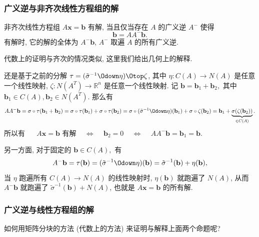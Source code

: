 \begin{frame}
\frametitle{广义逆与非齐次线性方程组的解}

\begin{prop}[广义逆与非齐次线性方程组]
非齐次线性方程组 $A\mathbf{x} = \mathbf{b}$ 有解, 当且仅当存在 $A$ 的广义逆 $A^-$ 使得
\[\mathbf{b} = A A^- \mathbf{b}.\]
有解时, 它的解的全体为 $A^-\mathbf{b}$, $A^-$ 取遍 $A$ 的所有广义逆.
\end{prop}

\pause
\vspace{0.5em}

代数上的证明与齐次的情况类似, 这里我们给出几何上的解释.

\vspace{0.5em}

还是基于之前的分解 $\tau = (\tilde{\sigma}^{-1} \Odown \eta) \Otop \zeta$, 其中 $\eta: C(A) \to N(A)$ 是任意一个线性映射, $\zeta: N(A^T) \to \mathbb{R}^n$ 是任意一个线性映射. 记 $\mathbf{b} = \mathbf{b}_1 + \mathbf{b}_2,$ 其中 $\mathbf{b}_1 \in C(A), \mathbf{b}_2 \in N(A^T)$. 那么有
\[
AA^-\mathbf{b} = \sigma \circ \tau(\mathbf{b}_1 + \mathbf{b}_2) = \sigma \circ \tau(\mathbf{b}_1) + \sigma \circ \tau(\mathbf{b}_2) = \sigma \circ (\tilde{\sigma}^{-1} \Odown \eta)(\mathbf{b}_1) + \sigma \circ \zeta(\mathbf{b}_2) = \mathbf{b}_1 + \underbrace{\sigma(\zeta(\mathbf{b}_2))}_{\in C(A)}.
\]
所以有 ~~ $A\mathbf{x} = \mathbf{b}$ 有解 ~ $\Longleftrightarrow$ ~ $\mathbf{b}_2 = 0$ ~ $\Longleftrightarrow$ ~ $AA^-\mathbf{b} = \mathbf{b}_1 = \mathbf{b}$.

\pause
\vspace{0.5em}

另一方面, 对于固定的 $\mathbf{b} \in C(A),$ 有
\[
A^- \mathbf{b} = \tau(\mathbf{b}) = (\tilde{\sigma}^{-1} \Odown \eta)(\mathbf{b}) = \tilde{\sigma}^{-1}(\mathbf{b}) + \eta(\mathbf{b}),
\]
当 $\eta$ 跑遍所有 $C(A) \to N(A)$ 的线性映射时, $\eta(\mathbf{b})$ 就跑遍了 $N(A)$, 从而 $A^-\mathbf{b}$ 就跑遍了 $\tilde{\sigma}^{-1}(\mathbf{b}) + N(A)$, 也就是 $A\mathbf{x} = \mathbf{b}$ 的所有解.

\end{frame}


\begin{frame}
\frametitle{广义逆与线性方程组的解}

{
\larger[1]
\begin{question}
如何用矩阵分块的方法 (代数上的方法) 来证明与解释上面两个命题呢?
\end{question}
}

\end{frame}

